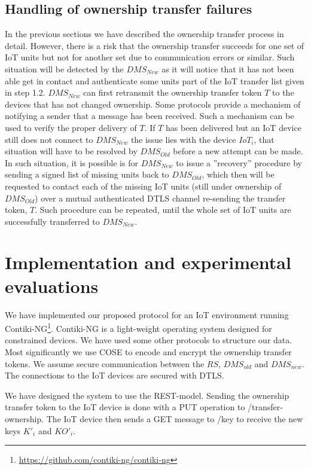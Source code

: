 {\subsection{Handling of ownership transfer failures}
\label{failures}
 In the previous sections we have described the ownership transfer process in detail. However, there is a risk that the ownership transfer succeeds for one set of IoT units but not for another set due to communication errors or similar. Such situation will be detected by the $DMS_{New}$ as it will notice that it has not been able get in contact and authenticate some units part of the IoT transfer list given in step 1.2. $DMS_{New}$ can first retransmit the ownership transfer token $T$ to the devices that has not changed ownership. Some protocols provide a mechanism of notifying a sender that a message has been received. Such a mechanism can be used to verify the proper delivery of $T$. If $T$ has been delivered but an IoT device still does not connect to $DMS_{New}$ the issue lies with the device $IoT_i$, that situation will have to be resolved by $DMS_{Old}$ before a new attempt can be made.  In such situation, it is possible is for $DMS_{New}$ to issue a ''recovery'' procedure by sending a signed list of missing units back to $DMS_{Old}$, which then will be requested to contact each of the missing IoT units (still under ownership of $DMS_{Old}$) over a mutual authenticated DTLS channel re-sending the transfer token, $T$. Such procedure can be repeated, until the whole set of IoT units are successfully transferred to $DMS_{New}$.

\section{Implementation and experimental evaluations}
\label{Implementation}
We have implemented our proposed protocol for an IoT environment running Contiki-NG\footnote{ \url{https://github.com/contiki-ng/contiki-ng}}. Contiki-NG is a light-weight operating system designed for constrained devices. We have used some other protocols to structure our data. Most significantly we use COSE \cite{rfc8152} to encode and encrypt the ownership transfer tokens. We assume secure communication between the $RS$, $DMS_{old}$ and $DMS_{new}$. The connections to the IoT devices are secured with DTLS\cite{rfc6347}. 

We have designed the system to use the REST-model\cite{fielding2000representational}. Sending the ownership transfer token to the IoT device is done with a PUT operation to /transfer-ownership. The IoT device then sends a GET message to /key to receive the new keys $K'_i$ and $KO'_i$. 


}
